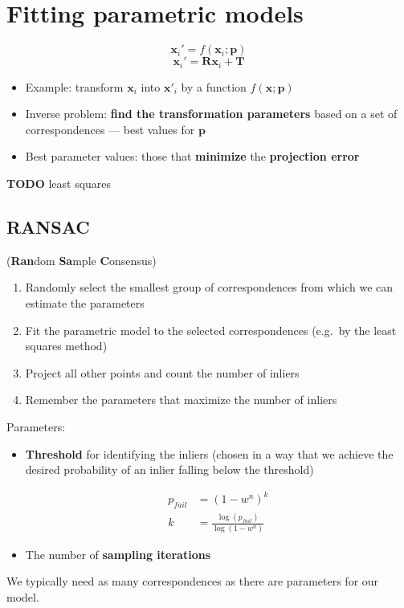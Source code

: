 \documentclass{article}
\begin{document}
    \newpage

\section{Fitting parametric models}
\[ \mathbf{x}_i' = f(\mathbf{x}_i ; \mathbf{p}) \]
\[ \mathbf{x}_i' = \mathbf{R} \mathbf{x}_i + \mathbf{T} \]

\begin{itemize}
    \item Example: transform $\mathbf{x}_i$ into $\mathbf{x'}_i$ by a function $f(\mathbf{x;p})$
    \item Inverse problem: \textbf{find the transformation parameters} based on a set of correspondences --- best values for $\mathbf{p}$
    \item Best parameter values: those that \textbf{minimize} the \textbf{projection error}
\end{itemize}

\textbf{TODO} least squares

    \subsection{RANSAC}
    (\textbf{Ran}dom \textbf{Sa}mple \textbf{C}onsensus)
    \begin{enumerate}
        \item Randomly select the smallest group of correspondences from which we can estimate the parameters
        \item Fit the parametric model to the selected correspondences (e.g.\ by the least squares method)
        \item Project all other points and count the number of inliers
        \item Remember the parameters that maximize the number of inliers
    \end{enumerate}

    \noindent Parameters:
    \begin{itemize}
        \item \textbf{Threshold} for identifying the inliers (chosen in a way that we achieve the desired probability of an inlier falling below the threshold)

            \begin{align*}
                p_{fail} &= {(1 - w^{n})}^k \\
                k &= \frac{\log{(p_{fail})}}{\log{(1 - w^n)}} 
            \end{align*}

        \item The number of \textbf{sampling iterations}
    \end{itemize}
    We typically need as many correspondences as there are parameters for our model. \\
\end{document}
